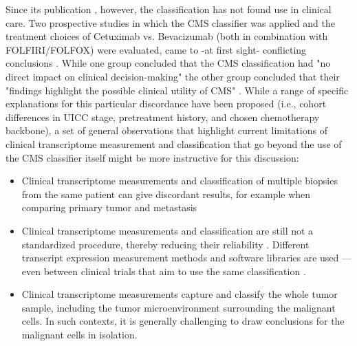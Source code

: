 \begin{flushleft}
Since its publication \parencite{guinneyConsensusMolecularSubtypes2015}, however, the classification has not found use in clinical care. Two prospective studies in which the CMS classifier was applied and the treatment choices of Cetuximab vs. Bevacizumab (both in combination with FOLFIRI/FOLFOX) were evaluated, came to -at first sight- conflicting conclusions \parencite{stintzingConsensusMolecularSubgroups2019, lenzImpactConsensusMolecular2019, aderkaExplainingUnexplainableDiscrepancies2019, sveenPredictiveModelingColorectal2019}. While one group concluded that the CMS classification had "no direct impact on clinical decision-making" \parencite{stintzingConsensusMolecularSubgroups2019,} the other group concluded that their "findings highlight the possible clinical utility of CMS" \parencite{lenzImpactConsensusMolecular2019}. While a range of specific explanations for this particular discordance have been proposed (i.e., cohort differences in UICC stage, pretreatment history, and chosen chemotherapy backbone), a set of general observations that highlight current limitations of clinical transcriptome measurement and classification that go beyond the use of the CMS classifier itself might be more instructive for this discussion: 

\begin{itemize} 
    \item Clinical transcriptome measurements and classification of multiple biopsies from the same patient can give discordant results, for example when comparing primary tumor and metastasis \parencite{eideMetastaticHeterogeneityConsensus2021}  
    \item Clinical transcriptome measurements and classification are still not a standardized procedure, thereby reducing their reliability \parencite{sveenPredictiveModelingColorectal2019}. Different transcript expression measurement methods and software libraries are used —even between clinical trials that aim to use the same classification \parencite{stintzingConsensusMolecularSubgroups2019, lenzImpactConsensusMolecular2019}.
    \item Clinical transcriptome measurements capture and classify the whole tumor sample, including the tumor microenvironment surrounding the malignant cells. In such contexts, it is generally challenging to draw conclusions for the malignant cells in isolation.
\end{itemize}


\end{flushleft}
